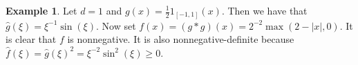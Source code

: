 \documentclass[a4paper,11pt]{article}%
\theoremstyle{plain}
\theoremstyle{definition}
\newtheorem{example}[theorem]{Example}
\numberwithin{equation}{section}
\newcommand{\R}{\mathbb{R}}
\newcommand{\ud}{\ensuremath{\mathrm{d}}}
\begin{document}


\begin{example}\label{Ex:nonnegative}
  Let $d = 1$ and $g(x) = \frac{1}{2}1_{[-1,1]}(x)$. Then we have that $ \widehat{g}(\xi) =
  \xi^{-1}\sin(\xi)$. Now set $f(x) = \left(g*g\right)(x) = 2^{-2}\max(2-|x|,0)$. It is clear that
  $f$ is nonnegative. It is also nonnegative-definite because $\widehat{f}(\xi) = \widehat{g}(\xi)^2
  = \xi^{-2}\sin^2 (\xi)\ge 0$.
\end{example}


\end{document}
